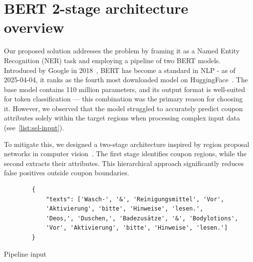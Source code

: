 \documentclass[licencjacka,en]{pracamgr}
\begin{document}
\chapter{BERT 2-stage architecture overview}
Our proposed solution addresses the problem by framing it as a Named Entity Recognition (NER) task and employing a pipeline of two BERT models. Introduced by Google in 2018~\cite{BERT_intro}, BERT has become a standard in NLP - as of 2025-04-04, it ranks as the fourth most downloaded model on HuggingFace~\cite{BERT_hf}. The base model contains 110 million parameters, and its output format is well-suited for token classification — this combination was the primary reason for choosing it. However, we observed that the model struggled to accurately predict coupon attributes solely within the target regions when processing complex input data (see~\ref{list:sel-input}).

To mitigate this, we designed a two-stage architecture inspired by region proposal networks in computer vision~\cite{Region_proposal}. The first stage identifies coupon regions, while the second extracts their attributes. This hierarchical approach significantly reduces false positives outside coupon boundaries.
\begin{center}
   \begin{listing}
        \begin{verbatim}
        {     
            "texts": ['Wasch-', '&', 'Reinigungsmittel', 'Vor',
            'Aktivierung', 'bitte', 'Hinweise', 'lesen.',
            'Deos,', 'Duschen,', 'Badezusätze', '&', 'Bodylotions',
            'Vor', 'Aktivierung', 'bitte', 'Hinweise', 'lesen.']
        }
        \end{verbatim}
        \caption{Pipeline input} 
        \label{list:sel-input}
    \end{listing}
\end{center}  
\end{document}
